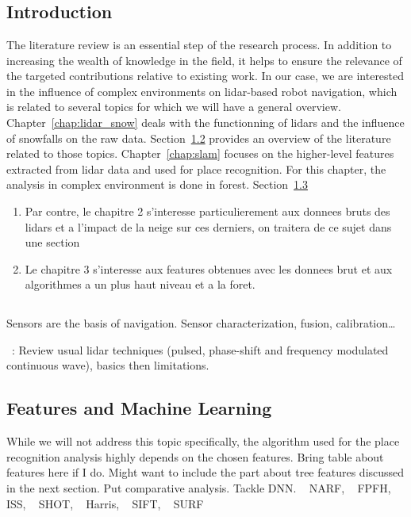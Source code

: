 \chapter{\chapzerotitle}
\label{chap:literature_review}


\section{Introduction}
The literature review is an essential step of the research process. In addition to increasing the wealth of knowledge in the field, it helps to ensure the relevance of the targeted contributions relative to existing work. In our case, we are interested in the influence of complex environments on \gls*{lidar}-based robot navigation, which is related to several topics for which we will have a general overview. Chapter~\ref{chap:lidar_snow} deals with the functionning of \gls*{lidar}s and the influence of snowfalls on the raw data. Section~\ref{sec:literature_snow} provides an overview of the literature related to those topics. Chapter~\ref{chap:slam} focuses on the higher-level features extracted from \gls*{lidar} data and used for place recognition. For this chapter, the analysis in complex environment is done in forest. Section~\ref{sec:literature_slam} 

\begin{enumerate}
    \item Par contre, le chapitre 2 s'interesse particulierement aux donnees bruts des lidars et a l'impact de la neige sur ces derniers, on traitera de ce sujet dans une section
    \item Le chapitre 3 s'interesse aux features obtenues avec les donnees brut et aux algorithmes a un plus haut niveau et a la foret. 
\end{enumerate}


\section{\chaplidartitle}
\label{sec:literature_snow}
Sensors are the basis of navigation. Sensor characterization, fusion, calibration\dots

~\cite{Bosch2001}:
Review usual lidar techniques (pulsed, phase-shift and frequency modulated continuous wave), basics then limitations.


\section{Features and Machine Learning}
\label{sec:literature_slam}
While we will not address this topic specifically, the algorithm used for the place recognition analysis highly depends on the chosen features.  
Bring table about features here if I do. Might want to include the part about tree features discussed in the next section. Put comparative analysis. Tackle DNN.
~\cite{Steder2011a} NARF, ~\cite{Rusu2009} FPFH, ~\cite{Yu2009} ISS, ~\cite{Tombari2010} SHOT, ~\cite{Harris1988} Harris, ~\cite{Lowe2004} SIFT, ~\cite{Bay2006} SURF

